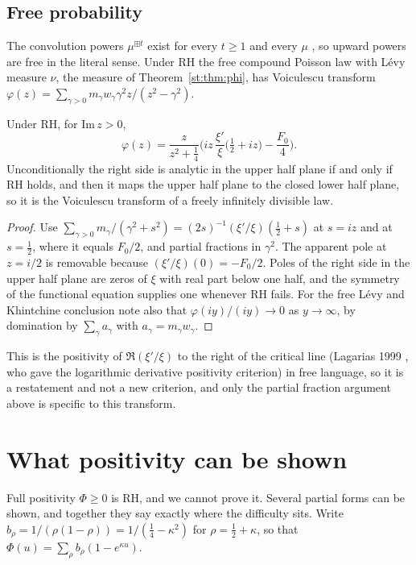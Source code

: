 \subsection{Free probability}
The convolution powers $\mu^{\boxplus t}$ exist for every $t\ge1$ and every $\mu$ \cite{NS06}, so upward powers are free in the literal sense. Under RH the free compound Poisson law with L\'evy measure $\nu$, the measure of Theorem~\ref{st:thm:phi}, has Voiculescu transform $\varphi(z)=\sum_{\gamma>0}m_\gamma w_\gamma\gamma^2z/(z^2-\gamma^2)$.
\begin{proposition}\label{st:prop:free}
Under RH, for $\mathrm{Im}\,z>0$,
\[
\varphi(z)=\frac{z}{z^2+\tfrac14}\Big(iz\,\frac{\xi'}{\xi}\big(\tfrac12+iz\big)-\frac{F_0}4\Big).
\]
Unconditionally the right side is analytic in the upper half plane if and only if RH holds, and then it maps the upper half plane to the closed lower half plane, so it is the Voiculescu transform of a freely infinitely divisible law.
\end{proposition}
\begin{proof}
Use $\sum_{\gamma>0}m_\gamma/(\gamma^2+s^2)=(2s)^{-1}(\xi'/\xi)(\tfrac12+s)$ at $s=iz$ and at $s=\tfrac12$, where it equals $F_0/2$, and partial fractions in $\gamma^2$. The apparent pole at $z=i/2$ is removable because $(\xi'/\xi)(0)=-F_0/2$. Poles of the right side in the upper half plane are zeros of $\xi$ with real part below one half, and the symmetry of the functional equation supplies one whenever RH fails. For the free L\'evy and Khintchine conclusion note also that $\varphi(iy)/(iy)\to0$ as $y\to\infty$, by domination by $\sum_\gamma a_\gamma$ with $a_\gamma=m_\gamma w_\gamma$.
\end{proof}
This is the positivity of $\Re(\xi'/\xi)$ to the right of the critical line (Lagarias 1999 \cite{Lagarias}, who gave the logarithmic derivative positivity criterion) in free language, so it is a restatement and not a new criterion, and only the partial fraction argument above is specific to this transform.

\section{What positivity can be shown}\label{st:sec:shown}
Full positivity $\Phi\ge0$ is RH, and we cannot prove it. Several partial forms can be shown, and together they say exactly where the difficulty sits. Write $b_\rho=1/(\rho(1-\rho))=1/(\tfrac14-\kappa^2)$ for $\rho=\tfrac12+\kappa$, so that $\Phi(u)=\sum_\rho b_\rho(1-e^{\kappa u})$.

